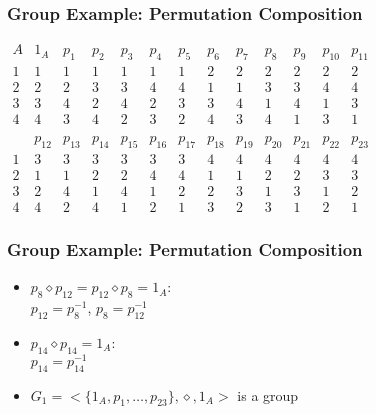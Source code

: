 \documentclass[dvipsnames]{beamer}
\begin{document}
\begin{frame}
  \frametitle{Group Example: Permutation Composition}

  \begin{example}[permutations on $\{1,2,3,4\}$]
    $\begin{array}{c|cccccccccccccccccccccccc}
        A & 1_{A}  & p_{1}  & p_{2}  & p_{3}  & p_{4}  & p_{5}
          & p_{6}  & p_{7}  & p_{8}  & p_{9}  & p_{10} & p_{11}\\\hline
        1 &   1    &   1    &   1    &   1    &   1    &  1
          &   2    &   2    &   2    &   2    &   2    &  2\\
        2 &   2    &   2    &   3    &   3    &   4    &  4
          &   1    &   1    &   3    &   3    &   4    &  4\\
        3 &   3    &   4    &   2    &   4    &   2    &  3
          &   3    &   4    &   1    &   4    &   1    &  3\\
        4 &   4    &   3    &   4    &   2    &   3    &  2
          &   4    &   3    &   4    &   1    &   3    &  1\\\\
          & p_{12} & p_{13} & p_{14} & p_{15} & p_{16} & p_{17}
          & p_{18} & p_{19} & p_{20} & p_{21} & p_{22} & p_{23}\\\hline
        1 &   3    &   3    &   3    &   3    &   3    &  3
          &   4    &   4    &   4    &   4    &   4    &  4\\
        2 &   1    &   1    &   2    &   2    &   4    &  4
          &   1    &   1    &   2    &   2    &   3    &  3\\
        3 &   2    &   4    &   1    &   4    &   1    &  2
          &   2    &   3    &   1    &   3    &   1    &  2\\
        4 &   4    &   2    &   4    &   1    &   2    &  1
          &   3    &   2    &   3    &   1    &   2    &  1
      \end{array}$
  \end{example}
\end{frame}

\begin{frame}
  \frametitle{Group Example: Permutation Composition}

  \begin{example}
    \begin{itemize}
      \item $p_8 \diamond p_{12}=p_{12} \diamond p_8=1_A$:\\
        $p_{12} = p_8^{-1}$, $p_8 = p_{12}^{-1}$
      \item $p_{14} \diamond p_{14}=1_A$:\\
        $p_{14} = p_{14}^{-1}$

      \pause
      \bigskip
      \item $G_1=<\{1_A,p_1,\dots,p_{23}\},\diamond,1_A>$ is a group
    \end{itemize}
  \end{example}
\end{frame}
\end{document}
